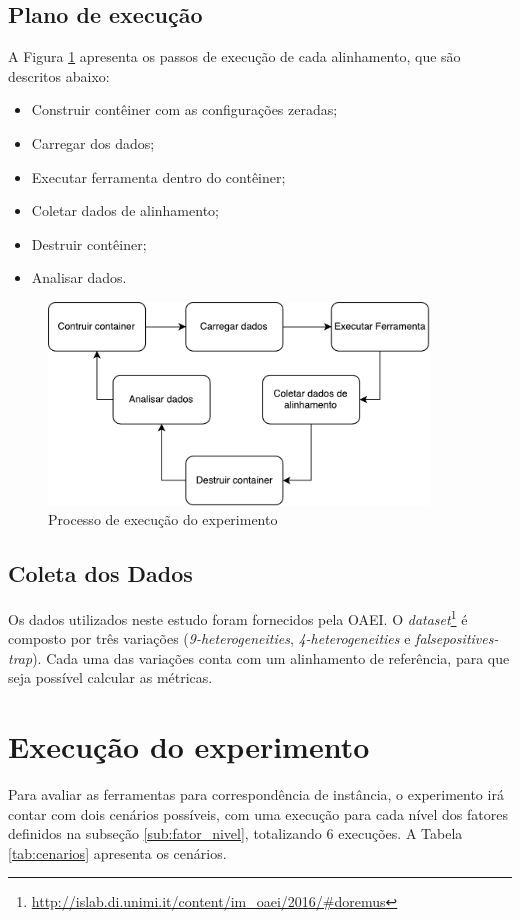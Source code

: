 \subsection{Plano de execução}
A Figura \ref{fig:experiment} apresenta os passos de execução de cada alinhamento, que são descritos abaixo:
\begin{itemize}
	\item Construir contêiner com as configurações zeradas;
	\item Carregar dos dados;
	\item Executar ferramenta dentro do contêiner;
	\item Coletar dados de alinhamento;
	\item Destruir contêiner;
	\item Analisar dados.
\end{itemize}

\begin{figure}[h]
	\centering
	\includegraphics[width=0.9\textwidth]{./imagens/experimento.pdf}
	\caption{Processo de execução do experimento}
	\label{fig:experiment}
\end{figure}

\subsection{Coleta dos Dados}
Os dados utilizados neste estudo foram fornecidos pela OAEI. O \textit{dataset}\footnote{\url{http://islab.di.unimi.it/content/im_oaei/2016/\#doremus}} é composto por três variações (\textit{9-heterogeneities}, \textit{4-heterogeneities} e \textit{falsepositives-trap}). Cada uma das variações conta com um alinhamento de referência, para que seja possível calcular as métricas.

\section{Execução do experimento}
Para avaliar as ferramentas para correspondência de instância, o experimento irá contar com dois cenários possíveis, com uma execução para cada nível dos fatores definidos na subseção \ref{sub:fator_nivel}, totalizando 6 execuções. A Tabela \ref{tab:cenarios} apresenta os cenários. 

